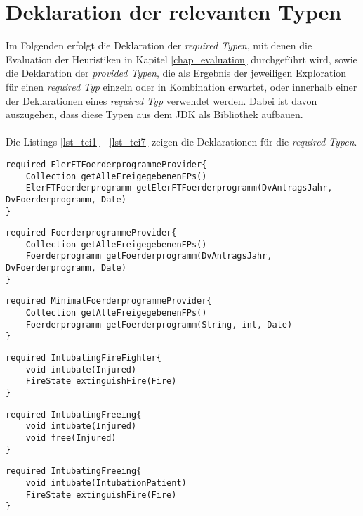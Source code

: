 \chapter{Deklaration der relevanten Typen}\label{app_evalTypes}
Im Folgenden erfolgt die Deklaration der \emph{required Typen}, mit denen die Evaluation der Heuristiken in Kapitel \ref{chap_evaluation} durchgeführt wird, sowie die Deklaration der \emph{provided Typen}, die als Ergebnis der jeweiligen Exploration für einen \emph{required Typ} einzeln oder in Kombination erwartet, oder innerhalb einer der Deklarationen eines \emph{required Typ} verwendet werden. Dabei ist davon auszugehen, dass diese Typen aus dem JDK als Bibliothek aufbauen.
\\\\
Die Listings \ref{lst_tei1} - \ref{lst_tei7} zeigen die Deklarationen für die \emph{required Typen}.
\begin{lstlisting}[style = dsl, caption = Deklaration von ElerFTFoerderprogrammeProvider, captionpos = b, label = lst_tei1]
required ElerFTFoerderprogrammeProvider{
	Collection getAlleFreigegebenenFPs()
	ElerFTFoerderprogramm getElerFTFoerderprogramm(DvAntragsJahr, DvFoerderprogramm, Date)
}
\end{lstlisting}
\begin{lstlisting}[style = dsl, caption = Deklaration von FoerderprogrammeProvider, captionpos = b, label = lst_tei2]
required FoerderprogrammeProvider{
	Collection getAlleFreigegebenenFPs()
	Foerderprogramm getFoerderprogramm(DvAntragsJahr, DvFoerderprogramm, Date)
}
\end{lstlisting}
\begin{lstlisting}[style = dsl, caption = Deklaration von MinimalFoerderprogrammeProvider, captionpos = b, label = lst_tei3]
required MinimalFoerderprogrammeProvider{
	Collection getAlleFreigegebenenFPs()
	Foerderprogramm getFoerderprogramm(String, int, Date)
}
\end{lstlisting}
\begin{lstlisting}[style = dsl, caption = Deklaration von IntubatingFireFighter, captionpos = b, label = lst_tei4]
required IntubatingFireFighter{
	void intubate(Injured)
	FireState extinguishFire(Fire)
}
\end{lstlisting}
\begin{lstlisting}[style = dsl, caption = Deklaration von IntubatingFreeing, captionpos = b, label = lst_tei5]
required IntubatingFreeing{
	void intubate(Injured)
	void free(Injured)
}
\end{lstlisting}
\begin{lstlisting}[style = dsl, caption = Deklaration von IntubatingPatientFireFighter, captionpos = b, label = lst_tei6]
required IntubatingFreeing{
	void intubate(IntubationPatient)
	FireState extinguishFire(Fire)
}
\end{lstlisting}
